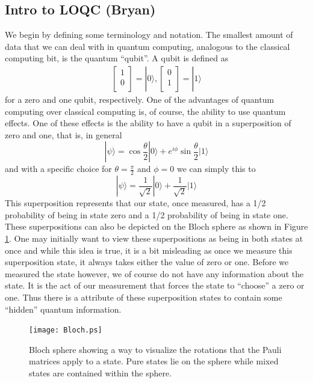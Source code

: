 \documentclass[aps,pra,twocolumn,amsmath,amssymb,nofootinbib,superscriptaddress]{revtex4}
\newcommand{\ket}[1]{|#1\rangle}
\begin{document}
\subsection{Intro to LOQC (Bryan)}
 We begin by defining some terminology and notation. The smallest amount of data that we can deal with in quantum computing, analogous to the classical computing bit, is the quantum ``qubit''. A qubit is defined as 
\begin{eqnarray}
 \left[ \begin{array}{l}
1 \\
0 \\
\end{array} \right] = \ket{0},
\left[ \begin{array}{l}
0 \\
1 \\
\end{array} \right] = \ket{1}
\end{eqnarray}
for a zero and one qubit, respectively. One of the advantages of quantum computing over classical computing is, of course, the ability to use quantum effects. One of these effects is the ability to have a qubit in a superposition of zero and one, that is, in general
\begin{equation}
\ket{\psi} = \cos{\frac{\theta}{2}} \ket{0} + e^{i \phi} \sin{\frac{\theta}{2}}\ket{1}
\end{equation}
 and with a specific choice for $\theta =\frac{\pi}{2}$ and $\phi =0$ we can simply this to
\begin{equation}
\ket{\psi}= \frac{1}{\sqrt{2}} \ket{0} + \frac{1}{\sqrt{2}} \ket{1}
\end{equation}
This superposition represents that our state, once measured, has a 1/2 probability of being in state zero and a 1/2 probability of being in state one. These superpositions can also be depicted on the Bloch sphere as shown in Figure \ref{fig:Bloch}. One may initially want to view these superpositions as being in both states at once and while this idea is true, it is a bit misleading as once we measure this superposition state, it always takes either the value of zero or one. Before we measured the state however, we of course do not have any information about the state. It is the act of our measurement that forces the state to ``choose'' a zero or one. Thus there is a attribute of these superposition states to contain some ``hidden'' quantum information.
\begin{figure}[bt]
 \centering
  \texttt{[image: Bloch.ps]}
  \caption{ Bloch sphere showing a way to visualize the rotations that the Pauli matrices apply to a state. Pure states lie on the sphere while mixed states are contained within the sphere.}
  \label{fig:Bloch}
\end{figure}
\end{document}

